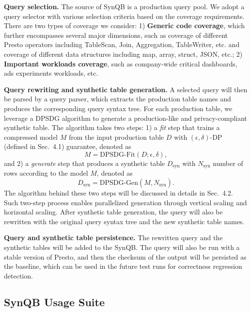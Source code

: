 \documentclass[11pt]{article}
\begin{document}
\textbf{Query selection.} The source of SynQB is a production query
pool. We adopt a query selector with various selection criteria based
on the coverage requirements. There are two types of coverage we
consider: 1) \textbf{Generic code coverage}, which further encompasses
several major dimensions, such as coverage of different Presto operators
including TableScan, Join, Aggregation, TableWriter, etc. and
coverage of different data structures including map, array, struct,
JSON, etc.; 2) \textbf{Important workloads coverage}, such as company-wide
critical dashboards, ads experiments workloads, etc.

\textbf{Query rewriting and synthetic table generation.} A selected
query will then be parsed by a query parser, which extracts the production
table names and produces the corresponding query syntax
tree. For each production table, we leverage a DPSDG algorithm to
generate a production-like and privacy-compliant synthetic table.
The algorithm takes two steps: 1) a \textit{fit} step that trains a compressed
model $M$ from the input production table $D$ with $(\epsilon,\delta)$-DP
(defined in Sec.~4.1) guarantee, denoted as
\begin{equation}
M = \text{DPSDG-Fit}(D; \epsilon, \delta),
\end{equation}
and 2) a \textit{generate} step that produces a synthetic table $D_{\text{syn}}$
with $N_{\text{syn}}$ number of rows according to the model $M$, denoted as
\begin{equation}
D_{\text{syn}} = \text{DPSDG-Gen}(M, N_{\text{syn}}).
\end{equation}
The algorithm behind these two steps will be discussed in details
in Sec.~4.2. Such two-step process enables parallelized generation
through vertical scaling and horizontal scaling. After synthetic table
generation, the query will also be rewritten with the original query
syntax tree and the new synthetic table names.

\textbf{Query and synthetic table persistence.} The rewritten query
and the synthetic tables will be added to the SynQB. The query will
also be run with a stable version of Presto, and then the checksum
of the output will be persisted as the baseline, which can be used
in the future test runs for correctness regression detection.

\subsection{SynQB Usage Suite}
\end{document}
